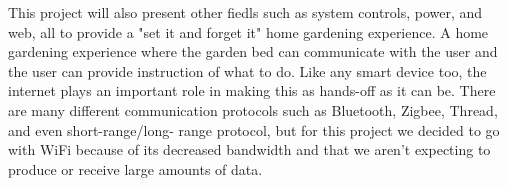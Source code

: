 \documentclass[journal]{IEEEtran}
\begin{document}
This project will also present other fiedls such as system controls, power, and web, all to provide 
a "set it and forget it" home gardening experience. A home gardening experience where the garden bed 
can communicate with the user and the user can provide instruction of what to do. Like any smart 
device too, the internet plays an important role in making this as hands-off as it can be. There are 
many different communication protocols such as Bluetooth, Zigbee, Thread, and even short-range/long-
range protocol, but for this project we decided to go with WiFi because of its decreased bandwidth and 
that we aren't expecting to produce or receive large amounts of data.
\end{document}
